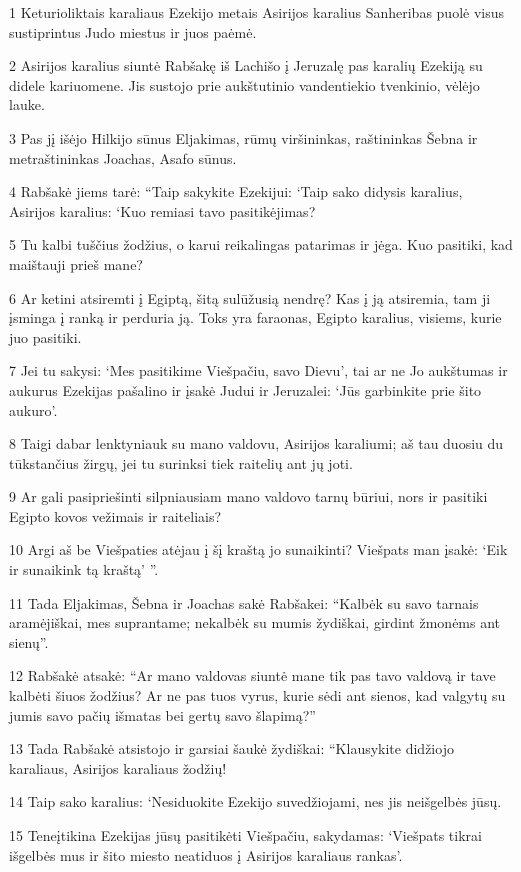 \par 1 Keturioliktais karaliaus Ezekijo metais Asirijos karalius Sanheribas puolė visus sustiprintus Judo miestus ir juos paėmė. 
\par 2 Asirijos karalius siuntė Rabšakę iš Lachišo į Jeruzalę pas karalių Ezekiją su didele kariuomene. Jis sustojo prie aukštutinio vandentiekio tvenkinio, vėlėjo lauke. 
\par 3 Pas jį išėjo Hilkijo sūnus Eljakimas, rūmų viršininkas, raštininkas Šebna ir metraštininkas Joachas, Asafo sūnus. 
\par 4 Rabšakė jiems tarė: “Taip sakykite Ezekijui: ‘Taip sako didysis karalius, Asirijos karalius: ‘Kuo remiasi tavo pasitikėjimas? 
\par 5 Tu kalbi tuščius žodžius, o karui reikalingas patarimas ir jėga. Kuo pasitiki, kad maištauji prieš mane? 
\par 6 Ar ketini atsiremti į Egiptą, šitą sulūžusią nendrę? Kas į ją atsiremia, tam ji įsminga į ranką ir perduria ją. Toks yra faraonas, Egipto karalius, visiems, kurie juo pasitiki. 
\par 7 Jei tu sakysi: ‘Mes pasitikime Viešpačiu, savo Dievu’, tai ar ne Jo aukštumas ir aukurus Ezekijas pašalino ir įsakė Judui ir Jeruzalei: ‘Jūs garbinkite prie šito aukuro’. 
\par 8 Taigi dabar lenktyniauk su mano valdovu, Asirijos karaliumi; aš tau duosiu du tūkstančius žirgų, jei tu surinksi tiek raitelių ant jų joti. 
\par 9 Ar gali pasipriešinti silpniausiam mano valdovo tarnų būriui, nors ir pasitiki Egipto kovos vežimais ir raiteliais? 
\par 10 Argi aš be Viešpaties atėjau į šį kraštą jo sunaikinti? Viešpats man įsakė: ‘Eik ir sunaikink tą kraštą’ ”. 
\par 11 Tada Eljakimas, Šebna ir Joachas sakė Rabšakei: “Kalbėk su savo tarnais aramėjiškai, mes suprantame; nekalbėk su mumis žydiškai, girdint žmonėms ant sienų”. 
\par 12 Rabšakė atsakė: “Ar mano valdovas siuntė mane tik pas tavo valdovą ir tave kalbėti šiuos žodžius? Ar ne pas tuos vyrus, kurie sėdi ant sienos, kad valgytų su jumis savo pačių išmatas bei gertų savo šlapimą?” 
\par 13 Tada Rabšakė atsistojo ir garsiai šaukė žydiškai: “Klausykite didžiojo karaliaus, Asirijos karaliaus žodžių! 
\par 14 Taip sako karalius: ‘Nesiduokite Ezekijo suvedžiojami, nes jis neišgelbės jūsų. 
\par 15 Teneįtikina Ezekijas jūsų pasitikėti Viešpačiu, sakydamas: ‘Viešpats tikrai išgelbės mus ir šito miesto neatiduos į Asirijos karaliaus rankas’. 
